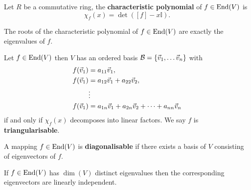 \begin{multicols}{2}
\begin{definition}
Let $R$ be a commutative ring, the \textbf{characteristic polynomial} of $f\in\mathrm{End}(V)$ is
    \[
    \chi_f(x) = \det([f]-x\mathbb{I}).
    \]
\end{definition}

\begin{theorem}[4.5.1]
The roots of the characteristic polynomial of $f\in\mathrm{End}(V)$ are exactly the eigenvalues of $f$.
\end{theorem}

\begin{theorem}[4.6.1]
Let $f\in\mathrm{End}(V)$ then $V$ has an ordered basis $\mathcal{B}=\{\vec{v}_1,\dots\vec{v}_n\}$ with
    \begin{align*}
        f(\vec{v}_1) &= a_{11}\vec{v}_1, \\
        f(\vec{v}_1) &= a_{12}\vec{v}_1 + a_{22}\vec{v}_2, \\
        &\vdots\\
        f(\vec{v}_1) &= a_{1n}\vec{v}_1 + a_{2n}\vec{v}_2 +\dots+a_{nn}\vec{v}_n \\
    \end{align*}
if and only if $\chi_f(x)$ decomposes into linear factors. We say $f$ is \textbf{triangularisable}.
\end{theorem}

\begin{definition}
A mapping $f\in\mathrm{End}(V)$ is \textbf{diagonalisable} if there exists a basis of $V$ consisting of eigenvectors of $f$.
\end{definition}

\begin{theorem}[4.6.8]
If $f\in\mathrm{End}(V)$ has $\dim(V)$ distinct eigenvalues then the corresponding eigenvectors are linearly independent.
\end{theorem}

\end{multicols}